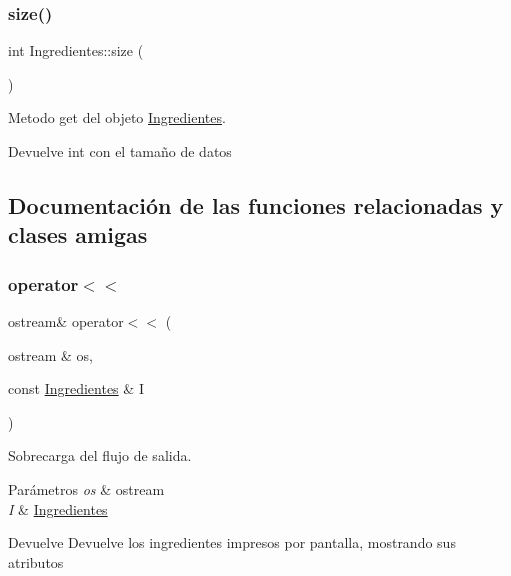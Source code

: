\subsubsection{\texorpdfstring{size()}{size()}}
{\footnotesize\ttfamily int Ingredientes\+::size (\begin{DoxyParamCaption}{ }\end{DoxyParamCaption})\hspace{0.3cm}{\ttfamily [inline]}}



Metodo get del objeto \hyperlink{classIngredientes}{Ingredientes}. 

\begin{DoxyReturn}{Devuelve}
int con el tamaño de datos 
\end{DoxyReturn}


\subsection{Documentación de las funciones relacionadas y clases amigas}
\mbox{\label{classIngredientes_a933ab431055a2a381448533ff8aa3299}} 
\subsubsection{\texorpdfstring{operator$<$$<$}{operator<<}}
{\footnotesize\ttfamily ostream\& operator$<$$<$ (\begin{DoxyParamCaption}\item[{ostream \&}]{os,  }\item[{const \hyperlink{classIngredientes}{Ingredientes} \&}]{I }\end{DoxyParamCaption})\hspace{0.3cm}{\ttfamily [friend]}}



Sobrecarga del flujo de salida. 


\begin{DoxyParams}{Parámetros}
{\em os} & ostream \\
\hline
{\em I} & \hyperlink{classIngredientes}{Ingredientes} \\
\hline
\end{DoxyParams}
\begin{DoxyReturn}{Devuelve}
Devuelve los ingredientes impresos por pantalla, mostrando sus atributos 
\end{DoxyReturn}
\mbox{\label{classIngredientes_afa2cabeefdee6cf26890ffd55bb3a7f3}} 
